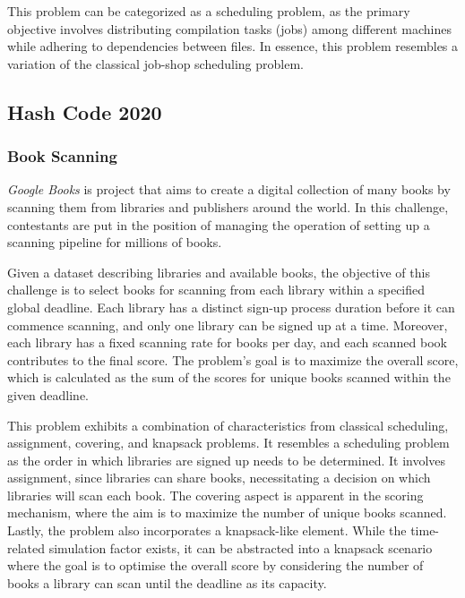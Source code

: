 This problem can be categorized as a scheduling problem, as the primary
objective involves distributing compilation tasks (jobs) among different
machines while adhering to dependencies between files. In essence, this problem
resembles a variation of the classical job-shop scheduling problem.

\subsection{Hash Code 2020}
\label{subsec:hashcode-2020}

\subsubsection*{Book Scanning}
\label{subsubsec:hashcode-2020-qualification}

\textit{Google Books} is project that aims to create a digital collection of many books
by scanning them from libraries and publishers around the world. In this
challenge, contestants are put in the position of managing the operation of
setting up a scanning pipeline for millions of books.

Given a dataset describing libraries and available books, the objective of this
challenge is to select books for scanning from each library within a specified
global deadline. Each library has a distinct sign-up process duration before it can
commence scanning, and only one library can be signed up at a time. Moreover,
each library has a fixed scanning rate for books per day, and each scanned book
contributes to the final score. The problem's goal is to maximize the overall
score, which is calculated as the sum of the scores for unique books scanned
within the given deadline.

This problem exhibits a combination of characteristics from classical
scheduling, assignment, covering, and knapsack problems. It resembles a
scheduling problem as the order in which libraries are signed up needs to be
determined. It involves assignment, since libraries can share books,
necessitating a decision on which libraries will scan each book. The covering
aspect is apparent in the scoring mechanism, where the aim is to maximize the
number of unique books scanned.  Lastly, the problem also incorporates a
knapsack-like element. While the time-related simulation factor exists, it can
be abstracted into a knapsack scenario where the goal is to optimise the overall
score by considering the number of books a library can scan until the deadline
as its capacity.

